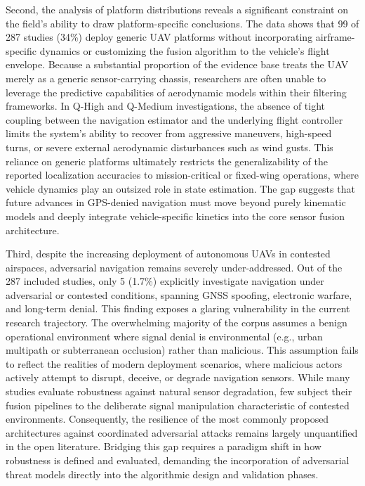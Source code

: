 \documentclass[conference]{IEEEtran}
\begin{document}
Second, the analysis of platform distributions reveals a significant constraint on the field's ability to draw platform-specific conclusions. The data shows that 99 of 287 studies (34\%) deploy generic UAV platforms without incorporating airframe-specific dynamics or customizing the fusion algorithm to the vehicle's flight envelope. Because a substantial proportion of the evidence base treats the UAV merely as a generic sensor-carrying chassis, researchers are often unable to leverage the predictive capabilities of aerodynamic models within their filtering frameworks. In Q-High and Q-Medium investigations, the absence of tight coupling between the navigation estimator and the underlying flight controller limits the system's ability to recover from aggressive maneuvers, high-speed turns, or severe external aerodynamic disturbances such as wind gusts. This reliance on generic platforms ultimately restricts the generalizability of the reported localization accuracies to mission-critical or fixed-wing operations, where vehicle dynamics play an outsized role in state estimation. The gap suggests that future advances in GPS-denied navigation must move beyond purely kinematic models and deeply integrate vehicle-specific kinetics into the core sensor fusion architecture.


Third, despite the increasing deployment of autonomous UAVs in contested airspaces, adversarial navigation remains severely under-addressed. Out of the 287 included studies, only 5 (1.7\%) explicitly investigate navigation under adversarial or contested conditions, spanning GNSS spoofing, electronic warfare, and long-term denial. This finding exposes a glaring vulnerability in the current research trajectory. The overwhelming majority of the corpus assumes a benign operational environment where signal denial is environmental (e.g., urban multipath or subterranean occlusion) rather than malicious. This assumption fails to reflect the realities of modern deployment scenarios, where malicious actors actively attempt to disrupt, deceive, or degrade navigation sensors. While many studies evaluate robustness against natural sensor degradation, few subject their fusion pipelines to the deliberate signal manipulation characteristic of contested environments. Consequently, the resilience of the most commonly proposed architectures against coordinated adversarial attacks remains largely unquantified in the open literature. Bridging this gap requires a paradigm shift in how robustness is defined and evaluated, demanding the incorporation of adversarial threat models directly into the algorithmic design and validation phases.
\end{document}
